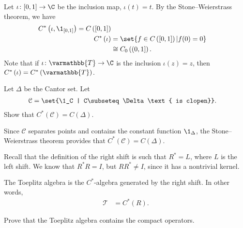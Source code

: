\documentclass[10pt]{mypackage}
\renewcommand*{\mathbb}[1]{\varmathbb{#1}}
\begin{document}
\begin{example}
  Let $\iota\colon [0,1]\rightarrow \C$ be the inclusion map, $\iota\left(t\right) = t$. By the Stone--Weierstrass theorem, we have
  \begin{align*}
    C^{\ast}\left(\iota,\1_{[0,1]}\right) = C\left([0,1]\right)\\
    C^{\ast}\left(\iota\right) &= \set{f\in C\left([0,1]\right) | f(0) = 0}\\
                               &\cong C_0\left((0,1]\right).
  \end{align*}
  Note that if $\iota\colon \mathbb{T}\rightarrow \C$ is the inclusion $\iota(z) = z$, then $C^{\ast}\left(\iota\right) = C^{\ast}\left(\mathbb{T}\right)$.
\end{example}
\begin{exercise}
  Let $\Delta$ be the Cantor set. Let
  \begin{align*}
    \mathcal{C} &= \set{\1_C | C\subseteq \Delta\text{ is clopen}}.
  \end{align*}
  Show that $C^{\ast}\left(\mathcal{C}\right) = C\left(\Delta\right)$.
\end{exercise}
\begin{solution}
  Since $\mathcal{C}$ separates points and contains the constant function $\1_{\Delta}$, the Stone--Weierstrass theorem provides that $C^{\ast}\left(\mathcal{C}\right) = C\left(\Delta\right)$.
\end{solution}
\begin{definition}
  Recall that the definition of the right shift is such that $R^{\ast} = L$, where $L$ is the left shift. We know that $R^{\ast}R = I$, but $RR^{\ast} \neq I$, since it has a nontrivial kernel.\newline

  The Toeplitz algebra is the $C^{\ast}$-algebra generated by the right shift. In other words,
  \begin{align*}
    \mathcal{T} &= C^{\ast}\left(R\right).
  \end{align*}
\end{definition}
\begin{exercise}
  Prove that the Toeplitz algebra contains the compact operators.
\end{exercise}
\end{document}
